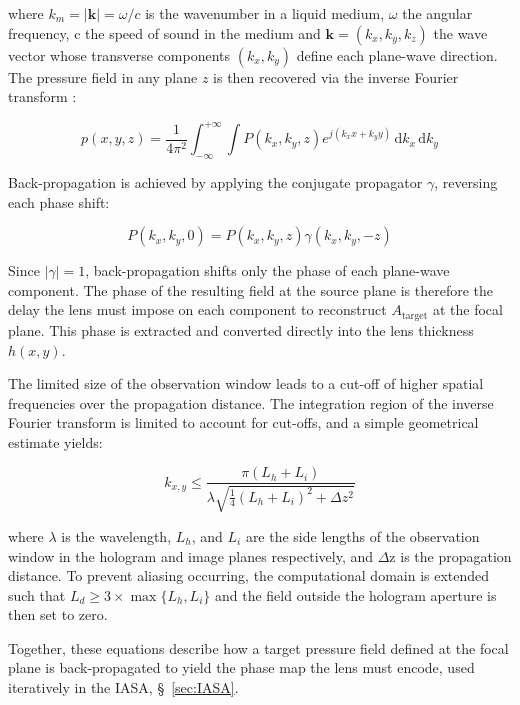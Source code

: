 \documentclass[11pt,a4paper]{article}
\begin{document}
\noindent where $k_m = |\mathbf{k}| = \omega/c$ is the wavenumber in a liquid medium, $\omega$ the angular frequency, c the speed of sound in the medium and $\mathbf{k} = (k_x, k_y, k_z)$ the wave vector whose transverse components $(k_x, k_y)$ define each plane-wave direction. The pressure field in any plane $z$ is then recovered via the inverse Fourier transform \cite{konijnenberg2021optics}:

\begin{equation}
    p(x, y, z) = \frac{1}{4\pi^2} \int_{-\infty}^{+\infty} \int P(k_x, k_y, z)  e^{j(k_x x + k_y y)}\, \mathrm{d}k_x \, \mathrm{d}k_y
\end{equation}

\noindent Back-propagation is achieved by applying the conjugate propagator $\gamma$, reversing each phase shift:

\begin{equation}
    P(k_x, k_y, 0) = P(k_x, k_y, z) \gamma(k_x, k_y, -z)
\label{eq:back}
\end{equation}

\noindent Since $|\gamma| = 1$, back-propagation shifts only the phase of each plane-wave component. The phase of the resulting field at the source plane is therefore the delay the lens must impose on each component to reconstruct $A_\text{target}$ at the focal plane. This phase is extracted and converted directly into the lens thickness $h(x,y)$.

The limited size of the observation window leads to a cut-off of higher spatial frequencies over the propagation distance. The integration region of the inverse Fourier transform is limited to account for cut-offs, and a simple geometrical estimate yields:

\begin{equation}
k_{x,y} \leq \frac{\pi(L_h + L_i)}{\lambda\sqrt{\frac{1}{4}(L_h + L_i)^2 + \Delta z^2}}
\end{equation}

\noindent where $\lambda$ is the wavelength, $L_h$, and $L_i$ are the side lengths of the observation window in the hologram and image planes respectively, and $\Delta$z is the propagation distance. To prevent aliasing occurring, the computational domain is extended such that  $L_d \geq 3 \times \max\{L_h, L_i\}$ and the field outside the hologram aperture is then set to zero. 

Together, these equations describe how a target pressure field defined at the focal plane is back-propagated to yield the phase map the lens must encode, used iteratively in the IASA, \S~\ref{sec:IASA}.
\end{document}
